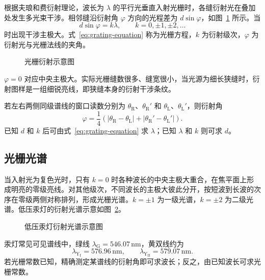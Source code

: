 \documentclass{../template/myrpt}
\begin{document}
根据夫琅和费衍射理论，波长为 $\lambda$ 的平行光垂直入射光栅时，各缝衍射光在叠加处发生多光束干涉。相邻缝沿衍射角 $\varphi$ 方向的光程差为 $d\sin\varphi$，如图~\ref{fig:grating-diffraction} 所示。当
\begin{equation}
  \label{eq:grating-equation}
  d\sin\varphi=k\lambda,\qquad k=0,\pm1,\pm2,\ldots
\end{equation}
时出现干涉主极大。式~\eqref{eq:grating-equation} 称为光栅方程，$k$ 为衍射级次，$\varphi$ 为衍射光与光栅法线的夹角。

\begin{figure}[!htbp]
  \centering
  
  \caption{光栅衍射示意图}
  \label{fig:grating-diffraction}
\end{figure}

$\varphi=0$ 对应中央主极大。实际光栅缝数很多、缝宽很小，当光源为细长狭缝时，衍射图样是一组细锐亮线，即狭缝本身的衍射干涉条纹。

若左右两侧同级谱线的窗口读数分别为 $\theta_{\mathrm{R}}$、$\theta_{\mathrm{R}}'$ 和 $\theta_{\mathrm{L}}$、$\theta_{\mathrm{L}}'$，则衍射角
\begin{equation}
  \label{eq:diffraction-angle}
  \varphi=\frac{1}{4}\left(\lvert\theta_{\mathrm{R}}-\theta_{\mathrm{L}}\rvert+\lvert\theta_{\mathrm{R}}'-\theta_{\mathrm{L}}'\rvert\right).
\end{equation}
已知 $d$ 和 $k$ 后可由式~\eqref{eq:grating-equation} 求 $\lambda$；已知 $\lambda$ 和 $k$ 则可求 $d$。

\subsection{光栅光谱}

当入射光为复色光时，只有 $k=0$ 时各种波长的中央主极大重合，在焦平面上形成明亮的零级亮线。对其他级次，不同波长的主极大彼此分开，按短波到长波的次序在零级两侧对称排列，形成光栅光谱。$k=\pm1$ 为一级光谱，$k=\pm2$ 为二级光谱。低压汞灯的衍射光谱示意如图~\ref{fig:mercury-spectrum}。

\begin{figure}[!htbp]
  \centering
  
  \caption{低压汞灯衍射光谱示意图}
  \label{fig:mercury-spectrum}
\end{figure}

汞灯常见可见谱线中，绿线 $\lambda_{\mathrm{G}}=546.07\,\si{\nano\metre}$，黄双线约为
\[
  \lambda_{\mathrm{Y_I}}=576.96\,\si{\nano\metre},\qquad
  \lambda_{\mathrm{Y_{II}}}=579.07\,\si{\nano\metre}.
\]
若光栅常数已知，精确测定某谱线的衍射角即可求波长；反之，由已知波长可求光栅常数。
\end{document}
